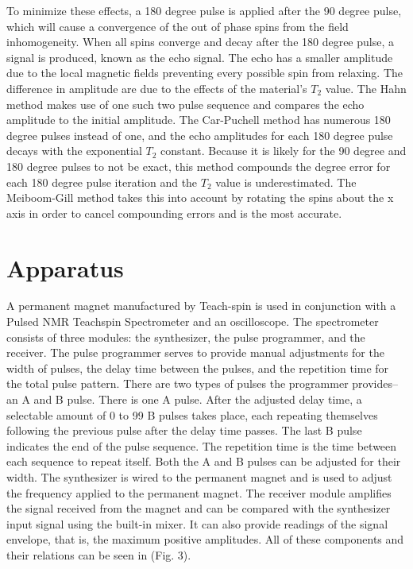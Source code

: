 \documentclass[]{report}
\begin{document}
To minimize these effects, a 180 degree pulse is applied after the 90 degree pulse, which will cause a convergence of the out of phase spins from the field inhomogeneity. When all spins converge and decay after the 180 degree pulse, a signal is produced, known as the echo signal. The echo has a smaller amplitude due to the local magnetic fields preventing every possible spin from relaxing. The difference in amplitude are due to the effects of the material's $T_{2}$ value. 
The Hahn method makes use of one such two pulse sequence and compares the echo amplitude to the initial amplitude.
The Car-Puchell method has numerous 180 degree pulses instead of one, and the echo amplitudes for each 180 degree pulse decays with the exponential $T_{2}$ constant. Because it is likely for the 90 degree and 180 degree pulses to not be exact, this method compounds the degree error for each 180 degree pulse iteration and the $T_{2}$ value is underestimated. The Meiboom-Gill method takes this into account by rotating the spins about the x axis in order to cancel compounding errors and is the most accurate. 

\section{Apparatus}

A permanent magnet manufactured by Teach-spin is used in conjunction with a Pulsed NMR Teachspin Spectrometer and an oscilloscope. The spectrometer consists of three modules: the synthesizer, the pulse programmer, and the receiver.
The pulse programmer serves to provide manual adjustments for the width of pulses, the delay time between the pulses, and the repetition time for the total pulse pattern. There are two types of pulses the programmer provides– an A and B pulse. There is one A pulse. After the adjusted delay time, a selectable amount of 0 to 99 B pulses takes place, each repeating themselves following the previous pulse after the delay time passes. The last B pulse indicates the end of the pulse sequence. The repetition time is the time between each sequence to repeat itself. Both the A and B pulses can be adjusted for their width.
The synthesizer is wired to the permanent magnet and is used to adjust the frequency applied to the permanent magnet.
The receiver module amplifies the signal received from the magnet and can be compared with the synthesizer input signal using the built-in mixer. It can also provide readings of the signal envelope, that is, the maximum positive amplitudes.
All of these components and their relations can be seen in (Fig. 3).
\end{document}
